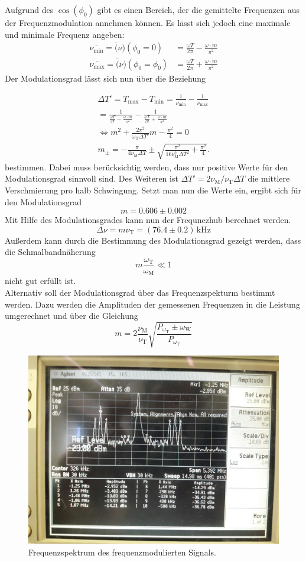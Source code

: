 Aufgrund des $\cos(\phi_0)$ gibt es einen Bereich, der die
gemittelte Frequenzen aus der Frequenzmodulation annehmen können. Es lässt
sich jedoch eine maximale und minimale Frequenz angeben:
\begin{align}
\bar{\nu_{\text{min}}}=\bar(\nu)(\phi_0=0)&=\frac{\omega T}{2\pi}-\frac{\omega \cdot m}{\pi^2}\\
\bar{\nu_{\text{max}}}=\bar(\nu)(\phi_0=\phi_0)&=\frac{\omega T}{2\pi}+\frac{\omega \cdot m}{\pi^2}
\end{align}
Der Modulationsgrad lässt sich nun über die Beziehung



\begin{align}
    \nonumber
\Delta T'=T_\text{max}-T_\text{min}=\frac{1}{\nu_\text{min}}-\frac{1}{\nu_\text{max}}\\
\nonumber
=\frac{1}{\frac{\omega T}{2\pi}-\frac{\omega \cdot m}{\pi^2}}-
\nonumber
 \frac{1}{\frac{\omega T}{2\pi}+\frac{\omega \cdot m}{\pi^2}}\\
 \nonumber
 \Leftrightarrow m^2+ \frac{2\pi^2}{\omega_\text{T} \Delta T'}m-\frac{\pi^2}{4}=0\\
 m_\pm=-\frac{\pi}{4\nu_\text{M}\Delta T}\pm\sqrt{\frac{\pi^2}{16\nu_\text{M}^2 \Delta T^2} +\frac{\pi^2}{4}}.
\end{align}
bestimmen. Dabei muss berücksichtig werden, dass nur positive Werte für den
Modulationsgrad sinnvoll sind. Des Weiteren ist $\Delta T'=2\nu_\text{M}/ \nu_\text{T}\Delta T$
die mittlere Verschmierung pro halb Schwingung. Setzt man nun die Werte ein, ergibt
sich für den Modulationsgrad
$$m= 0.606 \pm 0.002$$
Mit Hilfe des Modulationsgrades kann nun der Frequnezhub berechnet werden.
$$ \Delta \nu= m \nu_\text{T}= (76.4 \pm 0.2)\, \text{kHz}$$
Außerdem kann durch die Bestimmung des Modulationsgrad
gezeigt werden, dass die Schmalbandnäherung $$ m\frac{\omega_\text{T}}{\omega_\text{M}}\ll 1$$
nicht gut erfüllt ist.\\
Alternativ soll der Modulationsgrad über das Frequenzspekturm bestimmt werden.
Dazu werden die Amplituden der gemessenen Frequenzen
in die Leistung umgerechnet und über die Gleichung
$$ m= 2\frac{\nu_\text{M}}{\nu_\text{T}} \sqrt{\frac{P_{\omega_\text{T}} \pm \omega_\text{W}}{P_{\omega_\text{T}}} } $$
\begin{figure}
  \centering
  \includegraphics[width=0.7\linewidth]{ressources/photo5384285734183217710.jpg}
  \caption{Frequenzspektrum des frequenzmodulierten Signals.}
  \label{spek3}
\end{figure}

